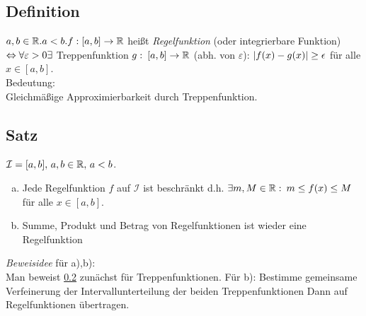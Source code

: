 \subsection{Definition}\label{sec:7.2}
$a,b \in \mathbb{R} . a < b.\\
f: [a,b] \to \mathbb{R}$ hei\ss t \emph{Regelfunktion} (oder integrierbare Funktion) $\Leftrightarrow\\
\forall \varepsilon > 0 \exists$ Treppenfunktion $g:\:[a,b] \to \mathbb{R}$ (abh. von $\varepsilon$): $\lvert f(x) - g(x) \rvert \ge \epsilon$ für alle $x \in [a,b]$.\\
Bedeutung:\\
Gleichmä\ss ige Approximierbarkeit durch Treppenfunktion.
\subsection[Satz: Regelfunktionen]{Satz}\label{sec:7.3}
$\mathcal{I} = [a,b],\, a,b \in \mathbb{R},\, a<b$.\\
\begin{enumerate}[a)]
	\item Jede Regelfunktion $f$ auf $\mathcal{I}$ ist beschränkt d.h. $\exists m,M \in \mathbb{R} :\: m \leq f(x) \leq M$ für alle $x \in [a,b]$.\\
	\item Summe, Produkt und Betrag von Regelfunktionen ist wieder eine Regelfunktion
\end{enumerate}
\emph{Beweisidee} für a),b):\\
Man beweist \ref{sec:7.3} zunächst für Treppenfunktionen. Für b): Bestimme gemeinsame Verfeinerung der Intervallunterteilung der beiden Treppenfunktionen
Dann auf Regelfunktionen übertragen.
